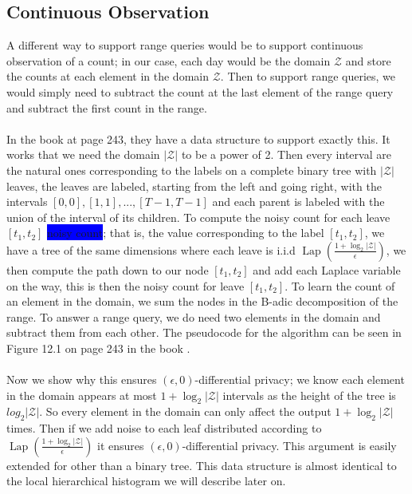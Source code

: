 \documentclass[11pt]{article}
\theoremstyle{definition}
\begin{document}
\subsection{Continuous Observation}
A different way to support range queries would be to support continuous observation of a count; in our case, each day would be the domain $\mathcal{Z}$ and store the counts at each element in the domain $\mathcal{Z}$. Then to support range queries, we would simply need to subtract the count at the last element of the range query and subtract the first count in the range. \\ \\
In the book \cite{algo_fun} at page 243, they have a data structure to support exactly this. It works that we need the domain $|\mathcal{Z}|$ to be a power of 2. Then every interval are the natural ones corresponding to the labels on a complete binary tree with $|\mathcal{Z}|$ leaves, the leaves are labeled, starting from the left and going right, with the intervals $[0,0],[1,1],...,[T-1, T-1]$ and each parent is labeled with the union of the interval of its children. To compute the noisy count for each leave $[t_1,t_2]$  \colorbox{blue}{noisy count}; that is, the value corresponding to the label $[t_1,t_2]$, we have a tree of the same dimensions where each leave is i.i.d $\operatorname{Lap}(\frac{1 + \log_2 |\mathcal{Z}|}{\epsilon})$, we then compute the path down to our node $[t_1,t_2]$ and add each Laplace variable on the way, this is then the noisy count for leave $[t_1,t_2]$. To learn the count of an element in the domain, we sum the nodes in the B-adic decomposition of the range. To answer a range query, we do need two elements in the domain and subtract them from each other. The pseudocode for the algorithm can be seen in Figure 12.1 on page 243 in the book \cite{algo_fun}. \\ \\
Now we show why this ensures $(\epsilon,0)$-differential privacy; we know each element in the domain appears at most $1 + \log_2 |\mathcal{Z}|$ intervals as the height of the tree is $log_2 |\mathcal{Z}|$. So every element in the domain can only affect the output $1 + \log_2 |\mathcal{Z}|$ times. Then if we add noise to each leaf distributed according to $\operatorname{Lap}(\frac{1 + \log_2 |\mathcal{Z}|}{\epsilon})$ it ensures $(\epsilon,0)$-differential privacy. This argument is easily extended for other than a binary tree. This data structure is almost identical to the local hierarchical histogram we will describe later on. \\
\end{document}
